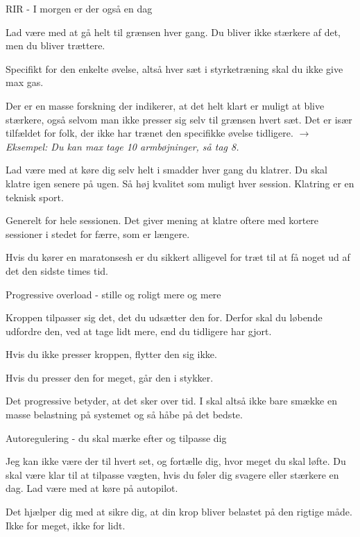 \begin{multicols}{2}
  \begin{tList}{RIR - I morgen er der også en dag}

  \item Lad være med at gå helt til grænsen hver gang. Du bliver ikke
    stærkere af det, men du bliver trættere.

  \item Specifikt for den enkelte øvelse, altså hver sæt i
    styrketræning skal du ikke give max gas.
  \item Der er en masse forskning der indikerer, at det helt klart er
    muligt at blive stærkere, også selvom man ikke presser sig selv
    til grænsen hvert sæt. Det er især tilfældet for folk, der ikke
    har trænet den specifikke øvelse tidligere.
    \emph{$\rightarrow$ Eksempel: Du kan max tage 10 armbøjninger, så tag 8.}

  \item Lad være med at køre dig selv helt i smadder hver gang du
    klatrer. Du skal klatre igen senere på ugen. Så høj kvalitet som
    muligt hver session. Klatring er en teknisk sport.

  \item Generelt for hele sessionen. Det giver mening at klatre
    oftere med kortere sessioner i stedet for færre, som er længere.

  \item Hvis du kører en maratonsesh er du sikkert alligevel for træt
    til at få noget ud af det den sidste times tid.
  \end{tList}

  \begin{tList}{Progressive overload - stille og roligt mere og mere}

  \item Kroppen tilpasser sig det, det du udsætter den for. Derfor
    skal du løbende udfordre den, ved at tage lidt mere, end du
    tidligere har gjort.

  \item Hvis du ikke presser kroppen, flytter den sig ikke.
  \item Hvis du presser den for meget, går den i stykker.

  \item Det progressive betyder, at det sker over tid. I skal altså
    ikke bare smække en masse belastning på systemet og så håbe på det bedste.
  \end{tList}

  \begin{tList}{Autoregulering - du skal mærke efter og tilpasse dig}

  \item Jeg kan ikke være der til hvert set, og fortælle dig, hvor
    meget du skal løfte. Du skal være klar til at tilpasse vægten,
    hvis du føler dig svagere eller stærkere en dag. Lad være med at
    køre på autopilot.

  \item Det hjælper dig med at sikre dig, at din krop bliver belastet
    på den rigtige måde. Ikke for meget, ikke for lidt.
  \end{tList}
\end{multicols}
